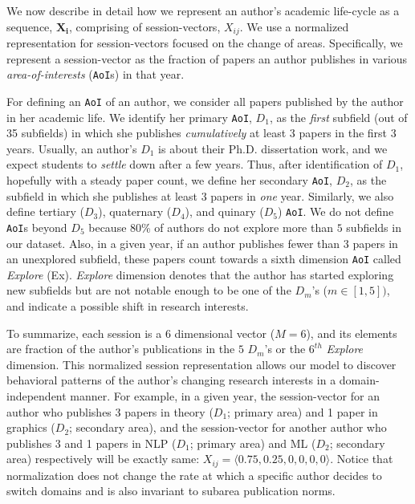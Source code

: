 We now describe in detail how we represent an author's academic life-cycle as a sequence, $\mathbf{X_i}$, comprising of session-vectors, $X_{ij}$. We use a normalized representation for session-vectors focused on the change of areas. Specifically, we represent a session-vector as the fraction of papers an author publishes in various \emph{area-of-interests} (\texttt{AoI}s) in that year.

For defining an \texttt{AoI} of an author, we consider all papers published by the author in her academic life. We identify her primary \texttt{AoI}, $D_1$, as the \emph{first} subfield (out of 35 subfields) in which she publishes \emph{cumulatively} at least $3$ papers in the first 3 years. Usually, an author's $D_1$ is about their Ph.D. dissertation work, and we expect students to \emph{settle} down after a few years. Thus, after identification of $D_1$, hopefully with a steady paper count, we define her secondary \texttt{AoI}, $D_2$, as the subfield in which she publishes at least $3$ papers in \emph{one} year. Similarly, we also define tertiary ($D_3$), quaternary ($D_4$), and quinary ($D_5$) \texttt{AoI}. We do not define \texttt{AoI}s beyond $D_5$ because 80\% of authors do not explore more than $5$ subfields in our dataset. Also, in a given year, if an author publishes fewer than $3$ papers in an unexplored subfield, these papers count towards a sixth dimension \texttt{AoI} called \emph{Explore} (Ex). \emph{Explore} dimension denotes that the author has started exploring new subfields but are not notable enough to be one of the $D_m$'s ($m \in {[1,5]})$, and indicate a possible shift in research interests.

To summarize, each session is a $6$ dimensional vector ($M=6$), and its elements are fraction of the author's publications in the $5$ $D_m$'s or the $6^{th}$ \emph{Explore} dimension. This normalized session representation allows our model to discover behavioral patterns of the author's changing research interests in a domain-independent manner. For example, in a given year, the session-vector for an author who publishes 3 papers in theory ($D_1$; primary area) and 1 paper in graphics ($D_2$; secondary area), and the session-vector for another author who publishes 3 and 1 papers in NLP ($D_1$; primary area) and ML ($D_2$; secondary area) respectively will be exactly same: $X_{ij} = \langle 0.75, 0.25, 0, 0, 0, 0\rangle$. Notice that normalization does not change the rate at which a specific author decides to switch domains and is also invariant to subarea publication norms.
